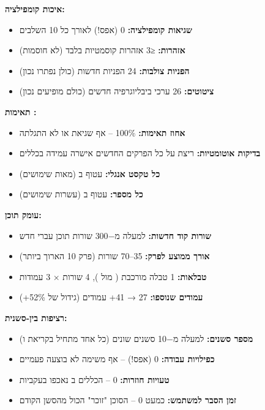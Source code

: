 \textbf{איכות קומפילציה:}
\begin{itemize}
  \item \textbf{שגיאות קומפילציה:} \num{0} (אפס!) לאורך כל \num{10} השלבים
  \item \textbf{אזהרות:} ≤\num{3} אזהרות קוסמטיות בלבד (לא חוסמות)
  \item \textbf{הפניות צולבות:} \num{24} הפניות חדשות (כולן נפתרו נכון)
  \item \textbf{ציטוטים:} \num{26} ערכי ביבליוגרפיה חדשים (כולם מופיעים נכון)
\end{itemize}

\textbf{תאימות :}
\begin{itemize}
  \item \textbf{אחוז תאימות:} \num{100}\% – אף שגיאת  או  לא התגלתה
  \item \textbf{בדיקות אוטומטיות:} ריצת  על כל הפרקים החדשים אישרה עמידה בכללים
  \item \textbf{כל טקסט אנגלי:} עטוף ב (מאות שימושים)
  \item \textbf{כל מספר:} עטוף ב (עשרות שימושים)
\end{itemize}

\textbf{עומק תוכן:}
\begin{itemize}
  \item \textbf{שורות קוד חדשות:} למעלה מ\num{-300} שורות תוכן עברי חדש
  \item \textbf{אורך ממוצע לפרק:} \num{35}–\num{70} שורות (פרק \num{10} הארוך ביותר)
  \item \textbf{טבלאות:} \num{1} טבלה מורכבת ( מול ), \num{4} שורות × \num{3} עמודות
  \item \textbf{עמודים שנוספו:} \num{27} → \num{41}+ עמודים (גידול של \num{52}\%+)
\end{itemize}

\textbf{רציפות בין-סשנית:}
\begin{itemize}
  \item \textbf{מספר סשנים:} למעלה מ\num{-10} סשנים שונים (כל אחד מתחיל בקריאת  ו)
  \item \textbf{כפילויות עבודה:} \num{0} (אפס!) – אף משימה לא בוצעה פעמיים
  \item \textbf{טעויות חוזרות:} \num{0} – הכללים ב נאכפו בעקביות
  \item \textbf{זמן הסבר למשתמש:} כמעט \num{0} – הסוכן "זוכר" הכול מהסשן הקודם
\end{itemize}

